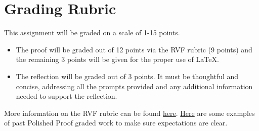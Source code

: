 \documentclass{article}
\theoremstyle{definition}
\begin{document}
\section*{Grading Rubric}
    This assignment will be graded on a scale of 1-15 points.
    \begin{itemize}
    \item The proof will be graded out of 12 points via the RVF rubric (9 points) and the remaining 3 points will be given for the proper use of \LaTeX.
    \item The reflection will be graded out of 3 points. It must be thoughtful and concise, addressing all the prompts provided and any additional information needed to support the reflection.
    \end{itemize}
     
    More information on the RVF rubric can be found 
    \href{https://drive.google.com/file/d/1P0OBjw-GkX64uCpYcqYmXARapf9MwaiI/view?usp=sharing}{here}. 
    \href{https://drive.google.com/file/d/1KAFQ7GBFpfUkyTBRZ30h5o6nXWwYDSML/view?usp=sharing}{Here} 
    are some examples of past Polished Proof graded work to make sure expectations are clear. 
	
\end{document}
